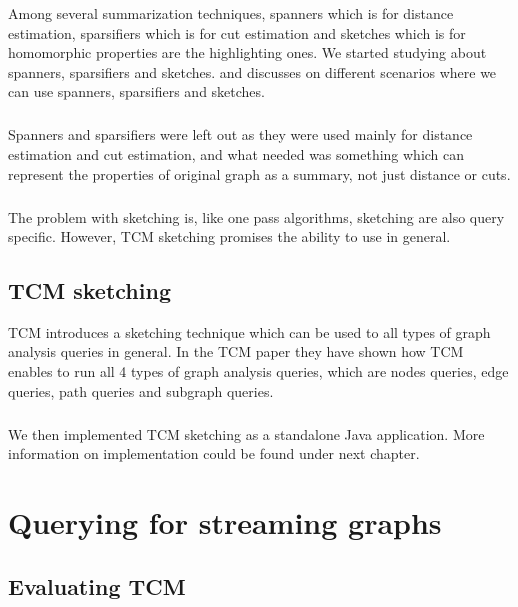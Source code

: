 \documentclass[12pt]{report}
\numberwithin{figure}{section}
\numberwithin{table}{section}
\begin{document}
Among several summarization techniques, spanners which is for distance estimation, sparsifiers which is for cut estimation and sketches which is for homomorphic properties are the highlighting ones. We started studying about spanners, sparsifiers and sketches. \cite{Graph sketches} and \cite{Graph stream algorithms survey} discusses on different scenarios where we can use spanners, sparsifiers and sketches.

\paragraph{}

Spanners and sparsifiers were left out as they were used mainly for distance estimation and cut estimation, and what needed was something which can represent the properties of original graph as a summary, not just distance or cuts.

\paragraph{}

The problem with sketching is, like one pass algorithms, sketching are also query specific. However, TCM sketching promises the ability to use in general. 

\section{TCM sketching}

TCM introduces a sketching technique which can be used to all types of graph analysis queries in general. In the TCM paper they have shown how TCM enables to run all 4 types of graph analysis queries, which are nodes queries, edge queries, path queries and subgraph queries. 

\paragraph{}

We then implemented TCM sketching as a standalone Java application. More information on implementation could be found under next chapter.

\chapter{Querying for streaming graphs}
\section{Evaluating TCM}
\end{document}
